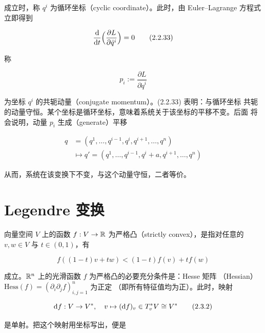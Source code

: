 成立时，称 $q^i$ 为循环坐标（cyclic coordinate）。此时，由
Euler--Lagrange 方程式立即得到

\begin{equation}
  \frac{\mathrm{d}}{\mathrm{d} t}\Bigl(\frac{\partial L}{\partial\dot q^i}\Bigr) = 0
  \tag{2.2.33}
\end{equation}

称

\begin{equation}
  p_i := \frac{\partial L}{\partial\dot q^i}
  \tag{2.2.34}
\end{equation}

为坐标 $q^i$ 的共轭动量（conjugate momentum）。(2.2.33) 表明：与循环坐标
共轭的动量守恒。某个坐标是循环坐标，意味着系统关于该坐标的平移不变。后面
将会说明，动量 $p_i$ 生成（generate）平移

\begin{equation}
\begin{aligned}
  q &= (q^1,\dots,q^{i-1},q^i,q^{i+1},\dots,q^n)\\
  &\mapsto q' = (q^1,\dots,q^{i-1},q^i + a,q^{i+1},\dots,q^n)
\end{aligned}
  \tag{2.2.35}
\end{equation}

从而，系统在该变换下不变，与这个动量守恒，二者等价。


\section{Legendre 变换}

向量空间 $V$ 上的函数 $f:V\to\mathbb{R}$ 为严格凸（strictly convex），是指对任意的
$v,w\in V$ 与 $t\in(0,1)$，有

\begin{equation}
  f((1-t)v + tw) < (1-t)f(v) + tf(w)
  \tag{2.3.1}
\end{equation}

成立。$\mathbb{R}^n$ 上的光滑函数 $f$ 为严格凸的必要充分条件是：Hesse 矩阵
（Hessian）$\mathrm{Hess}(f) = (\partial_i\partial_j f)_{i,j=1}^n$ 为正定
（即所有特征值均为正）。此时，映射

\begin{equation}
  \mathrm{d} f : V\to V^*,\quad v\mapsto (\mathrm{d} f)_v\in T_v^*V\cong V^*
  \tag{2.3.2}
\end{equation}

是单射。把这个映射用坐标写出，便是

